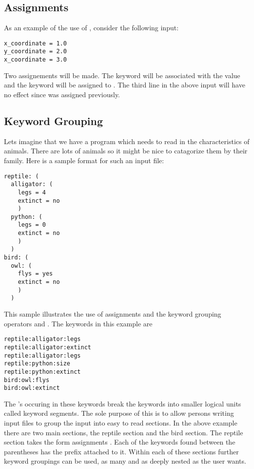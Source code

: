 \subsection{Assignments}
As an example of the use of \libip{}, consider the following input:
\begin{verbatim}
x_coordinate = 1.0
y_coordinate = 2.0
x_coordinate = 3.0
\end{verbatim}
Two assignements will be made.  The keyword  will be
associated with the value  and the keyword 
will be assigned to .  The third line in the above input
will have no effect since  was assigned previously.

\subsection{Keyword Grouping}
Lets imagine that we have a program
which needs to read in the characteristics of animals.  There are lots
of animals so it might be nice to catagorize them by their family.
Here is a sample format for such an input file:
\begin{verbatim}
reptile: (
  alligator: (
    legs = 4
    extinct = no
    )
  python: (
    legs = 0
    extinct = no
    )
  )
bird: (
  owl: (
    flys = yes
    extinct = no
    )
  )
\end{verbatim}

This sample illustrates the use of  \lit{=} 
assignments and the keyword grouping operators \lit{(} and \lit{)}.
The keywords in this example are
\begin{verbatim}
reptile:alligator:legs
reptile:alligator:extinct
reptile:alligator:legs
reptile:python:size
reptile:python:extinct
bird:owl:flys
bird:owl:extinct
\end{verbatim}

The \lit{:}'s occuring in these keywords break the keywords into
smaller logical units called keyword segments.  The sole purpose of this 
is to allow persons writing input files
to group the input into easy to read sections.  In the above example
there are two main sections, the reptile section and the bird section.
The reptile section takes the form  \lit{:} \lit{(}
 \lit{=}  assignments \lit{)}.  Each of the
keywords found between the parentheses has the  prefix
attached to it.  Within each of these sections further keyword groupings
can be used, as many and as deeply nested as the user wants.

